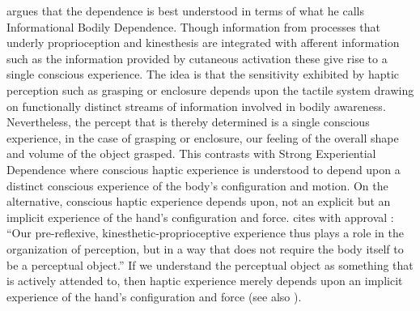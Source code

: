 \citet[chapter 4.8]{Fulkerson:2014ek} argues that the dependence is best understood in terms of what he calls Informational Bodily Dependence. Though information from processes that underly proprioception and kinesthesis are integrated with afferent information such as the information provided by cutaneous activation these give rise to a single conscious experience. The idea is that the sensitivity exhibited by haptic perception such as grasping or enclosure depends upon the tactile system drawing on functionally distinct streams of information involved in bodily awareness. Nevertheless, the percept that is thereby determined is a single conscious experience, in the case of grasping or enclosure, our feeling of the overall shape and volume of the object grasped. This contrasts with Strong Experiential Dependence where conscious haptic experience is understood to depend upon a distinct conscious experience of the body's configuration and motion. On the alternative, conscious haptic experience depends upon, not an explicit but an implicit experience of the hand's configuration and force. \citet[91]{Fulkerson:2014ek} cites with approval \citet[137]{Gallagher:2005ag}: ``Our pre-reflexive, kinesthetic-proprioceptive experience thus plays a role in the organization of perception, but in a way that does not require the body itself to be a perceptual object.'' If we understand the perceptual object as something that is actively attended to, then haptic experience merely depends upon an implicit experience of the hand's configuration and force (see also \citealt{Bower:2013aa}).


